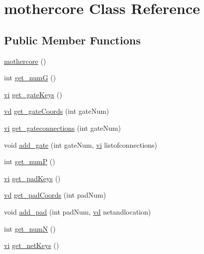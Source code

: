 \hypertarget{classmothercore}{}\section{mothercore Class Reference}
\label{classmothercore}
\subsection*{Public Member Functions}
\begin{DoxyCompactItemize}
\item 
\hyperlink{classmothercore_a4e87f0b1793e8630542ecdeda85b6aff}{mothercore} ()
\item 
int \hyperlink{classmothercore_a09c4a400c467d3919410e60059ce6d6b}{get\+\_\+numG} ()
\item 
\hyperlink{qplacer_8cpp_a2954e26aee7d16c4a58d5cfb5571ea7e}{vi} \hyperlink{classmothercore_a70c3317ac95e5633a546c559cab115af}{get\+\_\+gate\+Keys} ()
\item 
\hyperlink{qplacer_8cpp_a2f3b3a0095b65103cd56cf292e85fb85}{vd} \hyperlink{classmothercore_ab6b8c312d6900e5d00e8e27dd71dd0a7}{get\+\_\+gate\+Coords} (int gate\+Num)
\item 
\hyperlink{qplacer_8cpp_a2954e26aee7d16c4a58d5cfb5571ea7e}{vi} \hyperlink{classmothercore_a8aabd0cfa0d3847847479d38324cda08}{get\+\_\+gateconnections} (int gate\+Num)
\item 
void \hyperlink{classmothercore_a63e5b0b6f6bc0da68773f8d5be644ad1}{add\+\_\+gate} (int gate\+Num, \hyperlink{qplacer_8cpp_a2954e26aee7d16c4a58d5cfb5571ea7e}{vi} listofconnections)
\item 
int \hyperlink{classmothercore_a7c2f3835bf93b1eb4362ed3c2a337059}{get\+\_\+numP} ()
\item 
\hyperlink{qplacer_8cpp_a2954e26aee7d16c4a58d5cfb5571ea7e}{vi} \hyperlink{classmothercore_a3c88ba5f96b7a085fd09ea7838b78b59}{get\+\_\+pad\+Keys} ()
\item 
\hyperlink{qplacer_8cpp_a2f3b3a0095b65103cd56cf292e85fb85}{vd} \hyperlink{classmothercore_a0fee073bf0953a90161564224654b657}{get\+\_\+pad\+Coords} (int pad\+Num)
\item 
void \hyperlink{classmothercore_a5582864a594c614cffce53cdf41f74c2}{add\+\_\+pad} (int pad\+Num, \hyperlink{qplacer_8cpp_a2f3b3a0095b65103cd56cf292e85fb85}{vd} netandlocation)
\item 
int \hyperlink{classmothercore_ac704662ff0379b33e7a3a6c35b21fbe1}{get\+\_\+numN} ()
\item 
\hyperlink{qplacer_8cpp_a2954e26aee7d16c4a58d5cfb5571ea7e}{vi} \hyperlink{classmothercore_ad9591a88c1c16bf98bf9ca2714397119}{get\+\_\+net\+Keys} ()

\end{DoxyCompactItemize}
